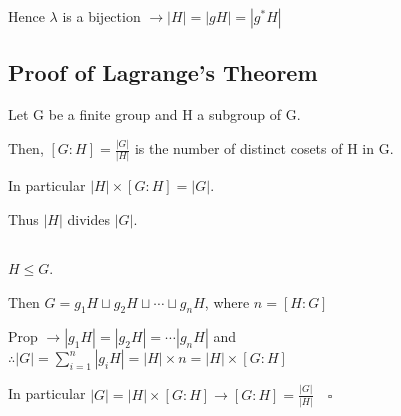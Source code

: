 \documentclass[12pt]{article}
\theoremstyle{plain}
\begin{document}
\noindent 
Hence \(\lambda\) is a bijection \(\rightarrow |H| = |gH| = |g^*H|\)

\subsection*{Proof of Lagrange's Theorem}
Let G be a finite group and H a subgroup of G. 

\noindent 
Then, \([G:H] = \frac{|G|}{|H|}\) is the number of distinct cosets of H in G.

\noindent 
In particular \(|H| \times [G:H] = |G|\).

\noindent 
Thus \(|H|\) divides \(|G|\).

\subsection*{}
\(H \leq G\). 

\noindent 
Then \(G = g_1H \sqcup g_2H \sqcup \cdots \sqcup g_nH\), where \(n = [H:G]\)

\noindent 
Prop \(\rightarrow |g_1H| = |g_2H| = \cdots |g_nH|\) and 
\(\therefore |G| = \displaystyle\sum_{i=1}^{n} |g_iH| = |H| \times n = |H| 
\times [G:H]\)

\noindent 
In particular \(|G| = |H| \times [G:H] \rightarrow [G:H] = \frac{|G|}{|H|} 
\quad \square\) 
\end{document}
